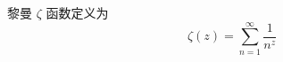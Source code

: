 
\begin{issues}
\issueDraft
\end{issues}

黎曼 $\zeta$ 函数定义为
\begin{equation}
\zeta(z) = \sum_{n=1}^\infty \frac{1}{n^z}
\end{equation}
